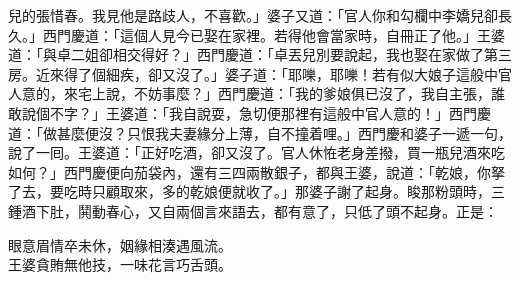 兒的張惜春。我見他是路歧人，不喜歡。」婆子又道：「官人你和勾欄中李嬌兒卻長久。」西門慶道：「這個人見今已娶在家裡。若得他會當家時，自冊正了他。」王婆道：「與卓二姐卻相交得好？」西門慶道：「卓丟兒別要說起，我也娶在家做了第三房。近來得了個細疾，卻又沒了。」婆子道：「耶嚛，耶嚛！若有似大娘子這般中官人意的，來宅上說，不妨事麼？」西門慶道：「我的爹娘俱已沒了，我自主張，誰敢說個不字？」王婆道：「我自說耍，急切便那裡有這般中官人意的！」{}西門慶道：「做甚麼便沒？只恨我夫妻緣分上薄，自不撞着哩。」西門慶和婆子一遞一句，說了一囘。王婆道：「正好吃酒，卻又沒了。官人休恠老身差撥，買一瓶兒酒來吃如何？」西門慶便向茄袋內，還有三四兩散銀子，都與王婆，說道：「乾娘，你拏了去，要吃時只顧取來，多的乾娘便就收了。」那婆子謝了起身。睃那粉頭時，三鍾酒下肚，鬨動春心，又自兩個言來語去，都有意了，只低了頭不起身。正是：

\begin{myquote} 
眼意眉情卒未休，姻緣相湊遇風流。\\王婆貪賄無他技，一味花言巧舌頭。
\end{myquote} 
 


